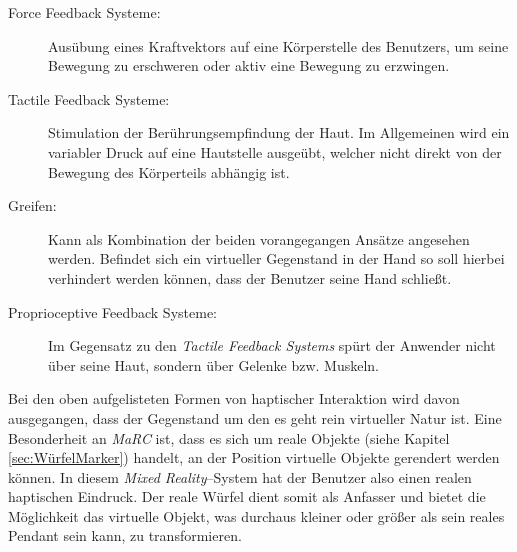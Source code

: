 \begin{description}
	\item[Force Feedback Systeme:] Ausübung eines Kraftvektors auf eine Körperstelle des Benutzers, um seine Bewegung zu erschweren oder aktiv eine Bewegung zu erzwingen. %
	\item[Tactile Feedback Systeme:] Stimulation der Berührungsempfindung der Haut. Im Allgemeinen wird ein variabler Druck auf eine Hautstelle ausgeübt, welcher nicht direkt von der Bewegung des Körperteils abhängig ist.
	\item[Greifen:] Kann als Kombination der beiden vorangegangen Ansätze angesehen werden. Befindet sich ein virtueller Gegenstand in der Hand so soll hierbei verhindert werden können, dass der Benutzer seine Hand schließt. 
	\item[Proprioceptive Feedback Systeme:] Im Gegensatz zu den \textit{Tactile Feedback Systems} spürt der Anwender nicht über seine Haut, sondern über Gelenke bzw. Muskeln. 
\end{description}

Bei den oben aufgelisteten Formen von haptischer Interaktion wird davon ausgegangen, dass der Gegenstand um den es geht rein virtueller Natur ist. Eine Besonderheit an \textit{MaRC} ist, dass es sich um reale Objekte (siehe Kapitel \ref{sec:WürfelMarker}) handelt, an der Position virtuelle Objekte gerendert werden können. In diesem \textit{Mixed Reality}--System hat der Benutzer also einen realen haptischen Eindruck. Der reale Würfel dient somit als Anfasser und bietet die Möglichkeit das virtuelle Objekt, was durchaus kleiner oder größer als sein reales Pendant sein kann, zu transformieren. 



